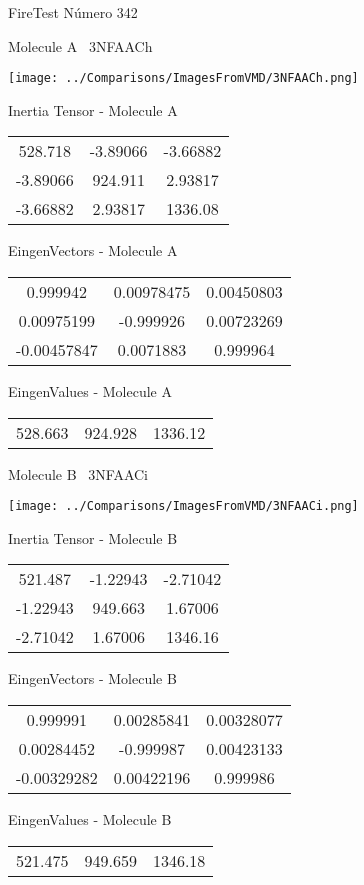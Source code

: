 \vtab[-3cm]
\begin{center}
{\large FireTest \tab Número 342}
\end{center}
\begin{multicols}{2}
\begin{center}

Molecule A \
3NFAACh

\texttt{[image: ../Comparisons/ImagesFromVMD/3NFAACh.png]}

Inertia Tensor - Molecule A \\
\begin{tabular}{|c c c|}
528.718	 & 	-3.89066	 & 	-3.66882	 \\
-3.89066	 & 	924.911	 & 	2.93817	 \\
-3.66882	 & 	2.93817	 & 	1336.08
\end{tabular}

\vtab
 EingenVectors - Molecule A     \\
\begin{tabular}{|c c c|}
0.999942	 & 	0.00978475	 & 	0.00450803	 \\
0.00975199	 & 	-0.999926	 & 	0.00723269	 \\
-0.00457847	 & 	0.0071883	 & 	0.999964
\end{tabular}

\vtab
 EingenValues - Molecule A     \\
\begin{tabular}{|c c c|}
528.663	 & 	924.928	 & 	1336.12	 \\
\end{tabular}
\columnbreak

Molecule B \
3NFAACi

\texttt{[image: ../Comparisons/ImagesFromVMD/3NFAACi.png]}

Inertia Tensor - Molecule B \\
\begin{tabular}{|c c c|}
521.487	 & 	-1.22943	 & 	-2.71042	 \\
-1.22943	 & 	949.663	 & 	1.67006	 \\
-2.71042	 & 	1.67006	 & 	1346.16
\end{tabular}

\vtab
 EingenVectors - Molecule B     \\
\begin{tabular}{|c c c|}
0.999991	 & 	0.00285841	 & 	0.00328077	 \\
0.00284452	 & 	-0.999987	 & 	0.00423133	 \\
-0.00329282	 & 	0.00422196	 & 	0.999986
\end{tabular}

\vtab
 EingenValues - Molecule B     \\
\begin{tabular}{|c c c|}
521.475	 & 	949.659	 & 	1346.18	 \\
\end{tabular}

\end{center}
\end{multicols}

